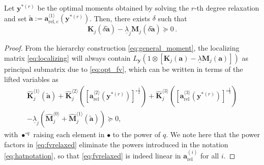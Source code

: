 \documentclass[final,onefignum,onetabnum]{siamart220329}
\newtheorem*{proof}{Proof}%
\begin{document}
\begin{proposition}\label{th:ub}
	Let $\mathbf{y}^{*(r)}$ be the optimal moments obtained by solving the $r$-th degree relaxation and set $\tilde{\mathbf{a}} := \mathbf{a}_{\mathrm{rel},e}^{\langle 1\rangle}(\mathbf{y}^{*(r)})$. Then, there exists $\delta$ such that
	\begin{equation}\label{eq:scalar_fvineq}
		\mathbf{K}_j(\delta\tilde{\mathbf{a}}) - \underline{\lambda}_j \mathbf{M}_j(\delta\tilde{\mathbf{a}}) \succeq 0\,.
	\end{equation}
\end{proposition}
\begin{proof}
	From the hierarchy construction {\eqref{eq:general_moment}}, the {localizing matrix \eqref{eq:localizing} will always contain $L_\mathbf{y}(1 \otimes \left[\mathbf{K}_j (\mathbf{a}) - \underline{\lambda} \mathbf{M}_j(\mathbf{a})\right])$ as principal submatrix due to} \eqref{eq:opt_fv}{, which} can be written in terms of the lifted variables as
	\begin{multline}\label{eq:fvrelaxed}
		\hat{\mathbf{K}}_j^{\langle 1\rangle}(\tilde{\mathbf{a}}) + \hat{\mathbf{K}}_j^{\langle 2\rangle}\left(\left[\mathbf{a}_{\mathrm{rel}}^{\langle 2\rangle}(\mathbf{y}^{*(r)})\right]^{\circ\frac{1}{2}}\right) + \hat{\mathbf{K}}_j^{\langle 3\rangle}\left(\left[\mathbf{a}_{\mathrm{rel}}^{\langle 3\rangle}(\mathbf{y}^{*(r)})\right]^{\circ\frac{1}{3}}\right) \\
		- \underline{\lambda}_j\left( \hat{\mathbf{M}}_j^{\langle 0\rangle} + \hat{\mathbf{M}}_j^{\langle 1\rangle}(\tilde{\mathbf{a}}) \right)\succeq 0,
	\end{multline}
	with $\bullet^{\circ q}$ raising each element in $\bullet$ to the power of $q$. We note here that the power factors in \eqref{eq:fvrelaxed} eliminate the powers introduced in the notation \eqref{eq:hatnotation}, so that \eqref{eq:fvrelaxed} is indeed linear in $\mathbf{a}_\mathrm{rel}^{(i)}$ for all $i$.
 

\end{proof}
\end{document}
